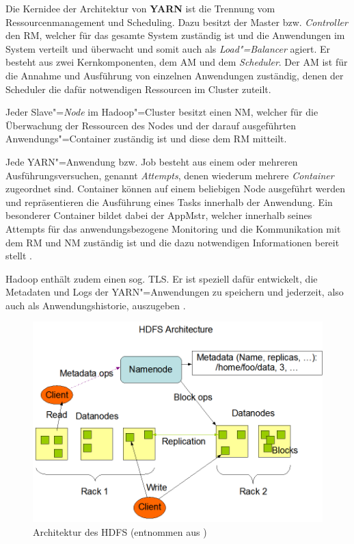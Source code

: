 Die Kernidee der Architektur von \textbf{YARN} ist die Trennung vom Ressourcenmanagement und Scheduling.
Dazu besitzt der Master bzw. \emph{Controller} den \ac{RM}, welcher für das gesamte System zuständig ist und die Anwendungen im System verteilt und überwacht und somit auch als \emph{Load"=Balancer} agiert.
Er besteht aus zwei Kernkomponenten, dem \ac{AM} und dem \emph{Scheduler}.
Der \ac{AM} ist für die Annahme und Ausführung von einzelnen Anwendungen zuständig, denen der Scheduler die dafür notwendigen Ressourcen im Cluster zuteilt.

Jeder Slave"=\emph{Node} im Hadoop"=Cluster besitzt einen \ac{NM}, welcher für die Überwachung der Ressourcen des Nodes und der darauf ausgeführten Anwendungs"=Container zuständig ist und diese dem \ac{RM} mitteilt.

Jede YARN"=Anwendung bzw. Job besteht aus einem oder mehreren Ausführungsversuchen, genannt \emph{Attempts}, denen wiederum mehrere \emph{Container} zugeordnet sind.
Container können auf einem beliebigen Node ausgeführt werden und repräsentieren die Ausführung eines Tasks innerhalb der Anwendung.
Ein besonderer Container bildet dabei der \ac{AppMstr}, welcher innerhalb seines Attempts für das anwendungsbezogene Monitoring und die Kommunikation mit dem \ac{RM} und \ac{NM} zuständig ist und die dazu notwendigen Informationen bereit stellt \cite{HadoopYarnArch271}.

Hadoop enthält zudem einen sog. \ac{TLS}.
Er ist speziell dafür entwickelt, die Metadaten und Logs der YARN"=Anwendungen zu speichern und jederzeit, also auch als Anwendungshistorie, auszugeben \cite{HadoopYarnTlServer271}.

\begin{figure}
    \includegraphics{./images/hdfsarchitecture.png}
    \caption[Architektur des HDFS]{Architektur des \acs{HDFS} (entnommen aus \cite{HadoopHdfsDesc271})}
    \label{fig:hdfsarch}
\end{figure}

